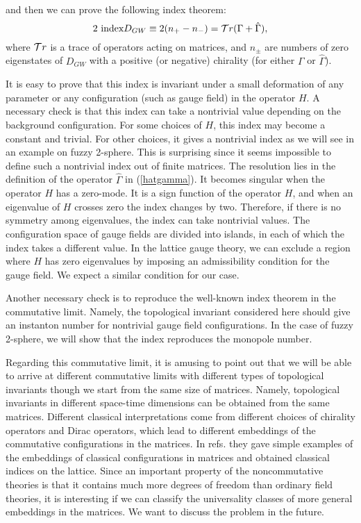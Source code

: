 \documentclass[a4paper,prl,showpacs,twocolumn]{revtex4}
\begin{document}
and then we can prove the following index theorem:
\begin{equation}
2 \ {\text {index}}D_{GW} \equiv 2(n_+ - n_-) = 
{\cal T}r (\Gamma + \hat{\Gamma}),
\label{indexth}
\end{equation}
where ${\cal T}r$ is a trace of operators acting on matrices, 
and $n_{\pm}$ are numbers of zero eigenstates of $D_{GW}$
with a positive (or negative) chirality (for either $\Gamma$
or $\hat{\Gamma}$).
\par
It is easy to prove that this index is invariant
under a small deformation of any parameter or any
configuration (such as gauge field) in the operator $H$.
A necessary check is that this index can take a nontrivial
value depending on the background configuration.
For some choices of $H$, this index may become a constant
and trivial. For other choices, it gives a nontrivial 
index as we will see in an example on fuzzy 2-sphere.
This is surprising since it seems impossible to define such a
nontrivial index out of finite matrices. The resolution lies in the
definition of the operator $\hat{\Gamma}$ in  (\ref{hatgamma}). 
It becomes singular when the operator $H$ has a zero-mode.
It is a sign function of the operator $H$,
and when an eigenvalue of $H$ crosses zero the index changes
by two. Therefore, if there is no symmetry among eigenvalues, 
the index can take nontrivial values.
The configuration space of gauge fields are divided into
islands, in each of which the index takes a  different value.
In the lattice gauge theory, we can exclude a region where
$H$ has zero eigenvalues by imposing an admissibility condition
for the gauge field. 
We expect a similar condition for our case.
\par
Another necessary check is to reproduce the well-known index 
theorem in the commutative limit. Namely, the topological 
invariant considered here should give an instanton number 
for nontrivial gauge field configurations.
In the case of fuzzy 2-sphere, we will show that the index 
reproduces the monopole number.
\par
Regarding this commutative limit, it is amusing to point out 
that we will be able to arrive at different commutative limits 
with different types of topological invariants
though we start from the same size of matrices.
Namely, topological invariants in different space-time dimensions 
can be obtained from the same matrices.
Different classical interpretations come from different choices 
of chirality
operators and  Dirac operators, which 
 lead to different embeddings of 
the commutative configurations in the matrices.
In refs.\cite{Kiskis,KikukawaSuzuki} they
gave simple examples of the embeddings of classical configurations
in matrices and obtained classical indices on the lattice.
Since an important property of the noncommutative theories
is that it contains much more degrees of freedom than ordinary
field theories, 
it is interesting if we can classify the universality classes
of more general embeddings in the matrices.
We want to discuss the problem in the future\cite{AINfuture}. 
\end{document}
